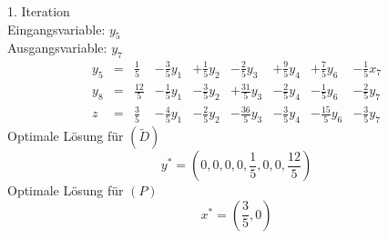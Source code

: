 \documentclass[a4paper]{scrartcl}
\begin{document}
\begin{enumerate}[label=\bfseries\arabic*.]
        1. Iteration \\
        Eingangsvariable: $y_5$ \\
        Ausgangsvariable: $y_7$
        \begin{equation}
            \begin{array}{rcrrrrrrr}
                y_5 & = & \frac{1}{5} & -\frac{3}{5}y_1 & +\frac{1}{5}y_2 & -\frac{2}{5}y_3 & +\frac{9}{5}y_4 & +\frac{7}{5}y_6 & -\frac{1}{5}x_7 \\
                y_8 & = & \frac{12}{5} & -\frac{1}{5}y_1 & -\frac{3}{5}y_2 & +\frac{31}{5}y_3 & -\frac{2}{5}y_4 & -\frac{1}{5}y_6 & -\frac{2}{5}y_7 \\
                \hline
                z & = & \frac{3}{5} & -\frac{4}{5}y_1 & -\frac{2}{5}y_2 & -\frac{36}{5}y_3 & -\frac{3}{5}y_4 & -\frac{15}{5}y_6 & -\frac{3}{5}y_7
            \end{array}
        \end{equation}
        Optimale Lösung für $(\tilde D)$ \\
        \begin{equation}
            y^* = \left( 0, 0, 0, 0, \frac{1}{5}, 0, 0, \frac{12}{5} \right)
        \end{equation}
        Optimale Lösung für $(P)$ \\
        \begin{equation}
            x^* = \left( \frac{3}{5}, 0 \right)
        \end{equation}

\end{enumerate}
\end{document}
